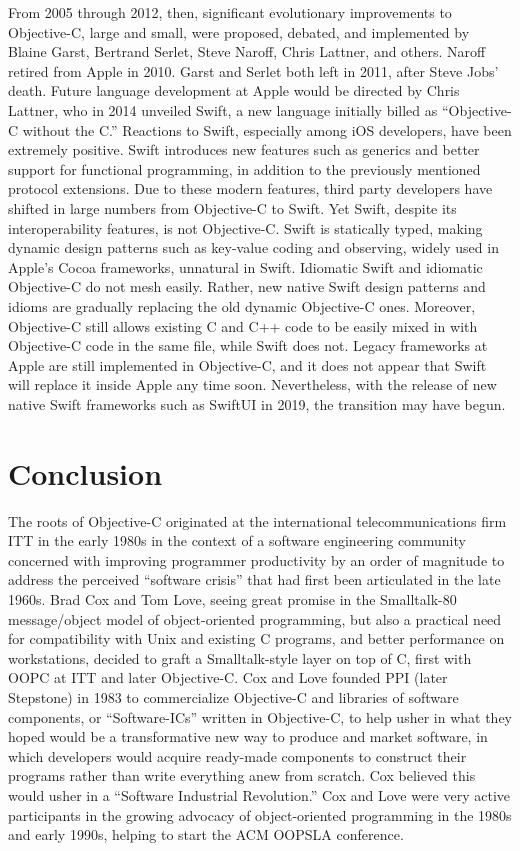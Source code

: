 \documentclass[acmsmall,screen]{acmart}
\begin{document}
From 2005 through 2012, then, significant evolutionary improvements to Objective-C, large and small, were proposed, debated, and implemented by Blaine Garst, Bertrand Serlet, Steve Naroff, Chris Lattner, and others. Naroff retired from Apple in 2010. Garst and Serlet both left in 2011, after Steve Jobs' death. Future language development at Apple would be directed by Chris Lattner, who in 2014 unveiled Swift, a new language initially billed as ``Objective-C without the C.'' Reactions to Swift, especially among iOS developers, have been extremely positive. Swift introduces new features such as generics and better support for functional programming, in addition to the previously mentioned protocol extensions. Due to these modern features, third party developers have shifted in large numbers from Objective-C to Swift. Yet Swift, despite its interoperability features, is not Objective-C. Swift is statically typed, making dynamic design patterns such as key-value coding and observing, widely used in Apple's Cocoa frameworks, unnatural in Swift. Idiomatic Swift and idiomatic Objective-C do not mesh easily. Rather, new native Swift design patterns and idioms are gradually replacing the old dynamic Objective-C ones. Moreover, Objective-C still allows existing C and C++ code to be easily mixed in with Objective-C code in the same file, while Swift does not. Legacy frameworks at Apple are still implemented in Objective-C, and it does not appear that Swift will replace it inside Apple any time soon. Nevertheless, with the release of new native Swift frameworks such as SwiftUI in 2019, the transition may have begun.
\section{Conclusion}
\label{sec-conclusion}
The roots of Objective-C originated at the international telecommunications firm ITT in the early 1980s in the context of a software engineering community concerned with improving programmer productivity by an order of magnitude to address the perceived ``software crisis'' that had first been articulated in the late 1960s. Brad Cox and Tom Love, seeing great promise in the Smalltalk-80 message/object model of object-oriented programming, but also a practical need for compatibility with Unix and existing C programs, and better performance on workstations, decided to graft a Smalltalk-style layer on top of C, first with OOPC at ITT and later Objective-C. Cox and Love founded PPI (later Stepstone) in 1983 to commercialize Objective-C and libraries of software components, or ``Software-ICs'' written in Objective-C, to help usher in what they hoped would be a transformative new way to produce and market software, in which developers would acquire ready-made components to construct their programs rather than write everything anew from scratch. Cox believed this would usher in a ``Software Industrial Revolution.'' Cox and Love were very active participants in the growing advocacy of object-oriented programming in the 1980s and early 1990s, helping to start the ACM OOPSLA conference.
\end{document}
